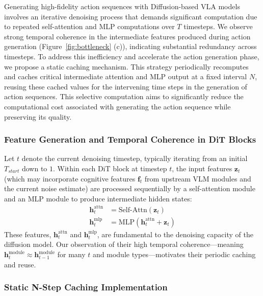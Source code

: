 Generating high-fidelity action sequences with Diffusion-based VLA models involves an iterative denoising process that demands significant computation due to repeated self-attention and MLP computations over $T$ timesteps. We observe strong temporal coherence in the intermediate features produced during action generation (Figure~\ref{fig:bottleneck} (c)), indicating substantial redundancy across timesteps. To address this inefficiency and accelerate the action generation phase, we propose a static caching mechanism. This strategy periodically recomputes and caches critical intermediate attention and MLP output at a fixed interval $N$, reusing these cached values for the intervening time steps in the generation of action sequences. This selective computation aims to significantly reduce the computational cost associated with generating the action sequence while preserving its quality.



\subsubsection{Feature Generation and Temporal Coherence in DiT Blocks}

Let $t$ denote the current denoising timestep, typically iterating from an initial $T_{start}$ down to $1$. Within each DiT block at timestep $t$, the input features $\mathbf{z}_t$ (which may incorporate cognitive features $\mathbf{f}_t$ from upstream VLM modules and the current noise estimate) are processed sequentially by a self-attention module and an MLP module to produce intermediate hidden states:
\begin{align}
\mathbf{h}_t^{\text{attn}} &= \text{Self-Attn}(\mathbf{z}_t) \label{eq:h_attn_comp_split} \\
\mathbf{h}_t^{\text{mlp}} &= \text{MLP}(\mathbf{h}_t^{\text{attn}}+\mathbf{z}_t) \label{eq:h_mlp_comp_split}
\end{align}
These features, $\mathbf{h}_t^{\text{attn}}$ and $\mathbf{h}_t^{\text{mlp}}$, are fundamental to the denoising capacity of the diffusion model. Our observation of their high temporal coherence—meaning $\mathbf{h}_t^{\text{module}} \approx \mathbf{h}_{t-1}^{\text{module}}$ for many $t$ and module types—motivates their periodic caching and reuse.

\subsubsection{Static N-Step Caching Implementation}

